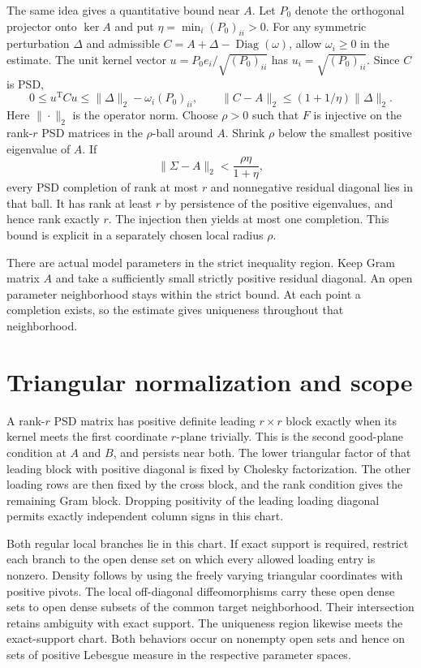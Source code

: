 \documentclass[11pt,a4paper]{amsart}
\newcommand{\Diag}{\operatorname{Diag}}
\begin{document}
The same idea gives a quantitative bound near $A$. Let $P_0$ denote the orthogonal projector onto $\ker A$ and put $\eta=\min_i(P_0)_{ii}>0$. For any symmetric perturbation $\Delta$ and admissible $C=A+\Delta-\Diag(\omega)$, allow $\omega_i\ge0$ in the estimate. The unit kernel vector $u=P_0e_i/\sqrt{(P_0)_{ii}}$ has $u_i=\sqrt{(P_0)_{ii}}$. Since $C$ is PSD,
\[
 0\le u^{\mathrm T} C u\le\|\Delta\|_2-\omega_i(P_0)_{ii},
 \qquad
 \|C-A\|_2\le (1+1/\eta)\|\Delta\|_2 .
\]
Here $\|\cdot\|_2$ is the operator norm. Choose $\rho>0$ such that $F$ is injective on the rank-$r$ PSD matrices in the $\rho$-ball around $A$. Shrink $\rho$ below the smallest positive eigenvalue of $A$. If
\[
                 \|\Sigma-A\|_2<\frac{\rho\eta}{1+\eta},
\]
every PSD completion of rank at most $r$ and nonnegative residual diagonal lies in that ball. It has rank at least $r$ by persistence of the positive eigenvalues, and hence rank exactly $r$. The injection then yields at most one completion. This bound is explicit in a separately chosen local radius $\rho$.

There are actual model parameters in the strict inequality region. Keep Gram matrix $A$ and take a sufficiently small strictly positive residual diagonal. An open parameter neighborhood stays within the strict bound. At each point a completion exists, so the estimate gives uniqueness throughout that neighborhood.

\section{Triangular normalization and scope}

A rank-$r$ PSD matrix has positive definite leading $r\times r$ block exactly when its kernel meets the first coordinate $r$-plane trivially. This is the second good-plane condition at $A$ and $B$, and persists near both. The lower triangular factor of that leading block with positive diagonal is fixed by Cholesky factorization. The other loading rows are then fixed by the cross block, and the rank condition gives the remaining Gram block. Dropping positivity of the leading loading diagonal permits exactly independent column signs in this chart.

Both regular local branches lie in this chart. If exact support is required, restrict each branch to the open dense set on which every allowed loading entry is nonzero. Density follows by using the freely varying triangular coordinates with positive pivots. The local off-diagonal diffeomorphisms carry these open dense sets to open dense subsets of the common target neighborhood. Their intersection retains ambiguity with exact support. The uniqueness region likewise meets the exact-support chart. Both behaviors occur on nonempty open sets and hence on sets of positive Lebesgue measure in the respective parameter spaces.
\end{document}
